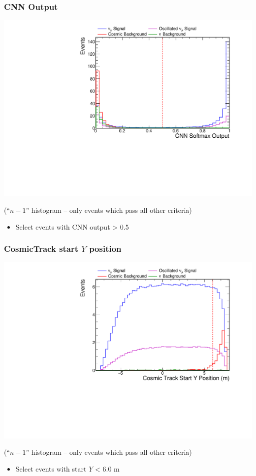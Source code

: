 \documentclass[10pt,professionalfonts,xcolor=table]{beamer}
\begin{document}
\begin{frame}

\frametitle{CNN Output}

  \begin{center}
  \includegraphics[height=0.7\textwidth, angle=-90]{figures/selection/n1_cvnnumu.pdf}

  {\footnotesize(``$n-1$'' histogram -- only events which pass all other criteria)}
  \end{center}
  \begin{itemize}
  \item Select events with CNN output > 0.5
  \end{itemize}
\end{frame}



\begin{frame}
\frametitle{CosmicTrack start $Y$ position}

  \begin{center}
  \includegraphics[height=0.7\textwidth, angle=-90]{figures/selection/n1_cosStartY.pdf}

  {\footnotesize(``$n-1$'' histogram -- only events which pass all other criteria)}
  \end{center}
  \begin{itemize}
  \item Select events with start $Y$ < 6.0 m
  \end{itemize}
\end{frame}
\end{document}
